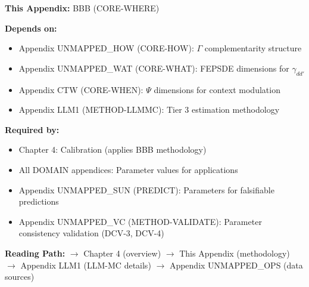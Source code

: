 \begin{tcolorbox}[colback=gray!10!white, colframe=gray!75!black,
    title=\textbf{Cross-Reference Footer}]

\textbf{This Appendix:} BBB (CORE-WHERE)

\textbf{Depends on:}
\begin{itemize}[nosep]
    \item Appendix UNMAPPED_HOW (CORE-HOW): $\Gamma$ complementarity structure
    \item Appendix UNMAPPED_WAT (CORE-WHAT): FEPSDE dimensions for $\gamma_{dd'}$
    \item Appendix CTW (CORE-WHEN): $\Psi$ dimensions for context modulation
    \item Appendix LLM1 (METHOD-LLMMC): Tier 3 estimation methodology
\end{itemize}

\textbf{Required by:}
\begin{itemize}[nosep]
    \item Chapter 4: Calibration (applies BBB methodology)
    \item All DOMAIN appendices: Parameter values for applications
    \item Appendix UNMAPPED_SUN (PREDICT): Parameters for falsifiable predictions
    \item Appendix UNMAPPED_VC (METHOD-VALIDATE): Parameter consistency validation (DCV-3, DCV-4)
\end{itemize}

\textbf{Reading Path:}
$\rightarrow$ Chapter 4 (overview) $\rightarrow$ This Appendix (methodology)
$\rightarrow$ Appendix LLM1 (LLM-MC details) $\rightarrow$ Appendix UNMAPPED_OPS (data sources)

\end{tcolorbox}

